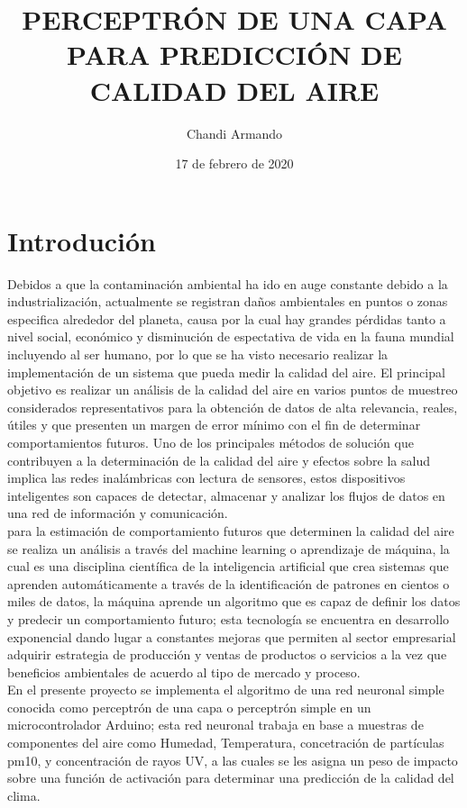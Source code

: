 \documentclass[10pt,a4paper]{article}
\begin{document}
\author{Chandi Armando} %
\title{\textbf{PERCEPTRÓN DE UNA CAPA PARA PREDICCIÓN DE CALIDAD DEL AIRE}}
\date{17 de febrero de 2020}
\maketitle  

\section{Introdución}

Debidos a que la contaminación ambiental ha ido en auge constante debido a la industrialización, actualmente se registran daños ambientales en puntos o zonas especifica alrededor del planeta, causa por la cual hay grandes pérdidas tanto a nivel social, económico y disminución de espectativa de vida en la fauna mundial incluyendo al ser humano, por lo que se ha visto necesario realizar la implementación de un sistema que pueda medir la calidad del aire. El principal objetivo es realizar un análisis de la calidad del aire en varios puntos de muestreo considerados representativos para la obtención de datos de alta relevancia, reales, útiles y que presenten un margen de error mínimo con el fin de determinar comportamientos futuros. Uno de los principales métodos de solución que contribuyen a la determinación de la calidad del aire y efectos sobre la salud implica las redes inalámbricas con lectura de sensores, estos dispositivos inteligentes son capaces de detectar, almacenar y analizar los flujos de datos en una red de información y comunicación.\\
para la estimación de comportamiento futuros que determinen la calidad del aire se realiza un análisis a través del machine learning o aprendizaje de máquina, la cual es una disciplina científica de la inteligencia artificial que crea sistemas que aprenden automáticamente a través de la identificación de patrones en cientos o miles de datos, la máquina aprende un algoritmo que es capaz de definir los datos y predecir un comportamiento futuro; esta tecnología se encuentra en desarrollo exponencial dando lugar a constantes mejoras que permiten al sector empresarial adquirir estrategia de producción y ventas de productos o servicios a la vez que beneficios ambientales de acuerdo al tipo de mercado y proceso.\\
En el presente proyecto se implementa el algoritmo de una red neuronal simple conocida como perceptrón de una capa o perceptrón simple en un microcontrolador Arduino; esta red neuronal trabaja en base a muestras de componentes del aire como Humedad, Temperatura, concetración de partículas pm10, y concentración de rayos UV, a las cuales se les asigna un peso de impacto sobre una función de activación para determinar una predicción de la calidad del clima.\\
\end{document}

